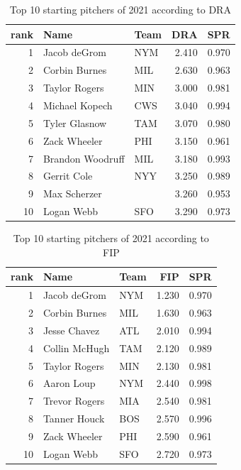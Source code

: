 \documentclass [52pt] {article}
\begin{document}
\begin{table}[h!]
\centering
\begin{tabular}{rllrr}
  \hline
 rank & Name & Team & DRA & SPR \\ 
  \hline
  1 & Jacob deGrom & NYM & 2.410 & 0.970 \\ 
  2 & Corbin Burnes & MIL & 2.630 & 0.963 \\ 
  3 & Taylor Rogers & MIN & 3.000 & 0.981 \\ 
  4 & Michael Kopech & CWS & 3.040 & 0.994 \\ 
  5 & Tyler Glasnow & TAM & 3.070 & 0.980 \\ 
  6 & Zack Wheeler & PHI & 3.150 & 0.961 \\ 
  7 & Brandon Woodruff & MIL & 3.180 & 0.993 \\ 
  8 & Gerrit Cole & NYY & 3.250 & 0.989 \\ 
  9 & Max Scherzer &  & 3.260 & 0.953 \\ 
 10 & Logan Webb & SFO & 3.290 & 0.973 \\ 
   \hline
\end{tabular}
\caption{Top 10 starting pitchers of 2021 according to DRA}
\label{tab : DRA}
\end{table}

\begin{table}[h!]
\centering
\begin{tabular}{rllrr}
  \hline
 rank & Name & Team & FIP & SPR \\ 
  \hline
    1 & Jacob deGrom & NYM & 1.230 & 0.970 \\ 
    2 & Corbin Burnes & MIL & 1.630 & 0.963 \\ 
    3 & Jesse Chavez & ATL & 2.010 & 0.994 \\ 
    4 & Collin McHugh & TAM & 2.120 & 0.989 \\ 
    5 & Taylor Rogers & MIN & 2.130 & 0.981 \\ 
    6 & Aaron Loup & NYM & 2.440 & 0.998 \\ 
    7 & Trevor Rogers & MIA & 2.540 & 0.981 \\ 
    8 & Tanner Houck & BOS & 2.570 & 0.996 \\ 
    9 & Zack Wheeler & PHI & 2.590 & 0.961 \\ 
   10 & Logan Webb & SFO & 2.720 & 0.973 \\ 
   \hline
\end{tabular}
\caption{Top 10 starting pitchers of 2021 according to FIP}
\end{table}
\end{document}
